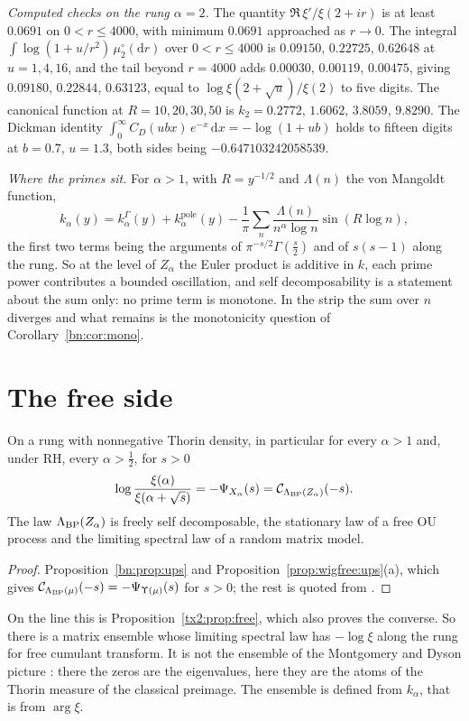 \medskip\noindent\textit{Computed checks on the rung $\alpha=2$.} The quantity $\Re\,\xi'/\xi(2+ir)$ is at least $0.0691$ on $0<r\le4000$, with minimum $0.0691$ approached as $r\to0$. The integral $\int\log(1+u/r^2)\,\mu_2^\circ(\mathrm dr)$ over $0<r\le4000$ is $0.09150$, $0.22725$, $0.62648$ at $u=1,4,16$, and the tail beyond $r=4000$ adds $0.00030$, $0.00119$, $0.00475$, giving $0.09180$, $0.22844$, $0.63123$, equal to $\log\xi(2+\sqrt u)/\xi(2)$ to five digits. The canonical function at $R=10,20,30,50$ is $k_2=0.2772$, $1.6062$, $3.8059$, $9.8290$. The Dickman identity $\int_0^\infty C_D(ubx)\,e^{-x}\,\mathrm dx=-\log(1+ub)$ holds to fifteen digits at $b=0.7$, $u=1.3$, both sides being $-0.647103242058539$.

\medskip\noindent\textit{Where the primes sit.} For $\alpha>1$, with $R=y^{-1/2}$ and $\Lambda(n)$ the von Mangoldt function,
\[
k_\alpha(y)=k^\Gamma_\alpha(y)+k^{\mathrm{pole}}_\alpha(y)-\frac1\pi\sum_n\frac{\Lambda(n)}{n^\alpha\log n}\sin(R\log n),
\]
the first two terms being the arguments of $\pi^{-s/2}\Gamma(\frac s2)$ and of $s(s-1)$ along the rung. So at the level of $Z_\alpha$ the Euler product is additive in $k$, each prime power contributes a bounded oscillation, and self decomposability is a statement about the sum only: no prime term is monotone. In the strip the sum over $n$ diverges and what remains is the monotonicity question of Corollary~\ref{bn:cor:mono}.

\section{The free side}\label{bn:sec:free}
\begin{proposition}\label{bn:prop:free}
On a rung with nonnegative Thorin density, in particular for every $\alpha>1$ and, under RH, every $\alpha>\frac12$, for $s>0$
\[
\log\frac{\xi(\alpha)}{\xi(\alpha+\sqrt s)}=-\Psi_{X_\alpha}(s)=\mathcal C_{\Lambda_{\rm BP}(Z_\alpha)}(-s).
\]
The law $\Lambda_{\rm BP}(Z_\alpha)$ is freely self decomposable, the stationary law of a free OU process and the limiting spectral law of a random matrix model.
\end{proposition}
\begin{proof}
Proposition~\ref{bn:prop:ups} and Proposition~\ref{prop:wigfree:ups}(a), which gives $\mathcal C_{\Lambda_{\rm BP}(\mu)}(-s)=-\Psi_{\Upsilon(\mu)}(s)$ for $s>0$; the rest is quoted from \cite{BNT02,BenaychGeorges05,CabanalDuvillard05}.
\end{proof}
On the line this is Proposition~\ref{tx2:prop:free}, which also proves the converse. So there is a matrix ensemble whose limiting spectral law has $-\log\xi$ along the rung for free cumulant transform. It is not the ensemble of the Montgomery and Dyson picture \cite{Montgomery73,Dyson62}: there the zeros are the eigenvalues, here they are the atoms of the Thorin measure of the classical preimage. The ensemble is defined from $k_\alpha$, that is from $\arg\xi$.

